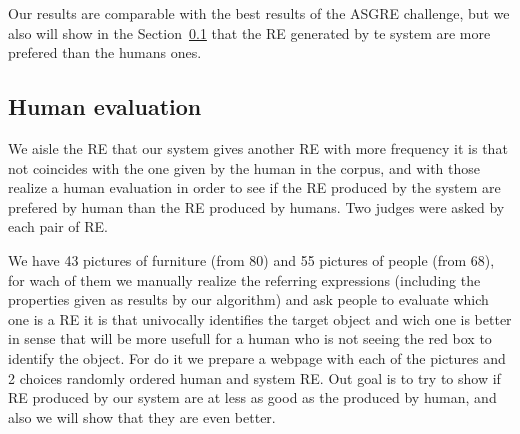 Our results are comparable with the best results of the ASGRE challenge, but we also will show in the Section~\ref{sec:evaluation} that the RE generated by te system are more prefered than the humans ones.

\subsection{Human evaluation} \label{sec:evaluation}

We aisle the RE that our system gives another RE with more frequency it is that not coincides with the one given by the human in the corpus, and with those realize a human evaluation in order to see if the RE produced by the system are prefered by human than the RE produced by humans. Two judges were asked by each pair of RE.

We have 43 pictures of furniture (from 80) and 55 pictures of people (from 68), for wach of them we manually realize the referring expressions (including the properties given as results by our algorithm) and ask people to evaluate which one is a RE it is that univocally identifies the target object and wich one is better in sense that will be more usefull for a human who is not seeing the red box to identify the object. For do it we prepare a webpage with each of the pictures and 2 choices randomly ordered human and system RE. Out goal is to try to show if RE produced by our system are at less as good as the produced by human, and also we will show that they are even better.



